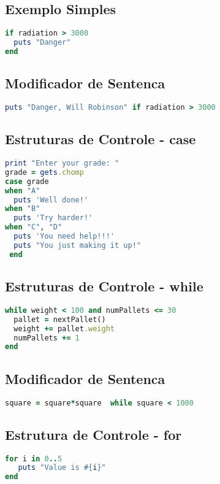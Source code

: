 \documentclass[serif,mathserif]{article}
\begin{document}
\subsection {Exemplo Simples}
\begin{lstlisting}[language=ruby]
if radiation > 3000
  puts "Danger"
end
\end{lstlisting}

\subsection {Modificador de Sentenca}
\begin{lstlisting}[language=ruby]
puts "Danger, Will Robinson" if radiation > 3000
\end{lstlisting}

\subsection{Estruturas de Controle - case} 
\begin{lstlisting}[language=ruby]
print "Enter your grade: "
grade = gets.chomp
case grade
when "A"
  puts 'Well done!'
when "B"
  puts 'Try harder!'
when "C", "D"
  puts 'You need help!!!'
  puts "You just making it up!"
 end
\end{lstlisting}


\subsection{Estruturas de Controle - while}
\begin{lstlisting}[language=ruby]
while weight < 100 and numPallets <= 30
  pallet = nextPallet()
  weight += pallet.weight
  numPallets += 1
end
\end{lstlisting}
 
\subsection {Modificador de Sentenca}
\begin{lstlisting}[language=ruby]
square = square*square  while square < 1000
\end{lstlisting}

\subsection{Estrutura de Controle -  for}
\begin{lstlisting}[language=ruby]
for i in 0..5
   puts "Value is #{i}"
end
\end{lstlisting}
\end{document}
